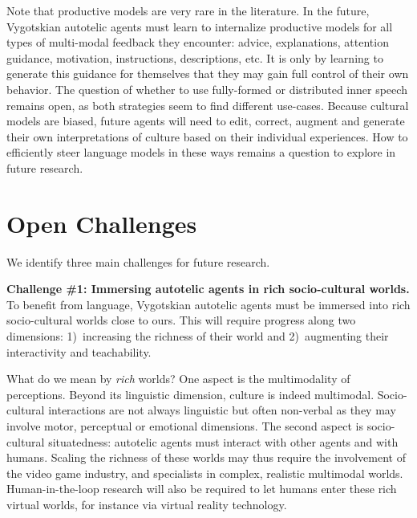 Note that productive models are very rare in the literature. In the future, Vygotskian autotelic agents must learn to internalize productive models for all types of multi-modal feedback they encounter: advice, explanations, attention guidance, motivation, instructions, descriptions, etc. It is only by learning to generate this guidance for themselves that they may gain full control of their own behavior. The question of whether to use fully-formed or distributed inner speech remains open, as both strategies seem to find different use-cases. Because cultural models are biased, future agents will need to edit, correct, augment and generate their own interpretations of culture based on their individual experiences. How to efficiently steer language models in these ways remains a question to explore in future research. 

\section{Open Challenges}
\label{sec:challenges}
We identify three main challenges for future research. 

\textbf{Challenge \#1: Immersing autotelic agents in rich socio-cultural worlds.}
To benefit from language, Vygotskian autotelic agents must be immersed into rich socio-cultural worlds close to ours. This will require progress along two dimensions: 1)~increasing the richness of their world and 2)~augmenting their interactivity and teachability.

What do we mean by \textit{rich} worlds? One aspect is the multimodality of perceptions. Beyond its linguistic dimension, culture is indeed multimodal. Socio-cultural interactions are not always linguistic but often non-verbal as they may involve motor, perceptual or emotional dimensions. The second aspect is socio-cultural situatedness: autotelic agents must interact with other agents and with humans. Scaling the richness of these worlds may thus require the involvement of the video game industry, and specialists in complex, realistic multimodal worlds. Human-in-the-loop research will also be required to let humans enter these rich virtual worlds, for instance via virtual reality technology. 

